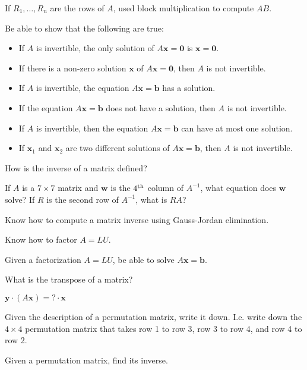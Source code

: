 \documentclass[minion]{homework}
\newcommand{\vx}{\mathbf{x}}
\newcommand{\vb}{\mathbf{b}}
\newcommand{\vy}{\mathbf{y}}
\newcommand{\vzero}{\mathbf{0}}
\newcommand{\vw}{\mathbf{w}}
\begin{document}
If $R_1,\ldots,R_n$ are the rows of $A$, used block multiplication to compute $AB$.

Be able to show that the following are true:
\begin{itemize}
	\item If $A$ is invertible, the only solution of $A\vx=\vzero$ is $\vx=\vzero$.
	\item If there is a non-zero solution $\vx$ of $A\vx=\vzero$, then
	$A$ is not invertible.
	\item If $A$ is invertible, the equation $A\vx=\vb$ has a solution.
	\item If the equation $A\vx=\vb$ does not have a solution, then
	$A$ is not invertible.
	\item If $A$ is invertible, then the equation $A\vx=\vb$ can have
	at most one solution.
	\item If $\vx_1$ and $\vx_2$ are two different solutions of
	      $A\vx=\vb$, then $A$ is not invertible.
\end{itemize}

How is the inverse of a matrix defined?

If $A$ is a $7\times 7$ matrix and $\vw$ is the $4^{\rm th}$ column of $A^{-1}$, what equation does $\vw$ solve?  If $R$ is the second row of $A^{-1}$, what is $RA$?

Know how to compute a matrix inverse using Gauss-Jordan elimination.

Know how to factor $A=LU$.

Given a factorization $A=LU$, be able to solve $A\vx=\vb$.

What is the transpose of a matrix?

$\vy \cdot (A\vx)=?\cdot \vx$

Given the description of a permutation matrix, write it down.  I.e. write down the $4\times 4$ permutation matrix that takes row 1 to row 3, row 3 to row 4, and row 4 to row 2.

Given a permutation matrix, find its inverse.
\end{document}
